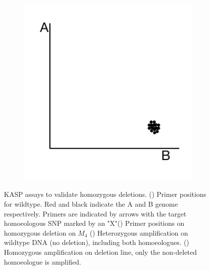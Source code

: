 \begin{figure}
\begin{subfigure}[b]{0.3\textwidth}
        \label{fig:poly:homFalse}
    \end{subfigure}
    ~
    \begin{subfigure}[b]{0.3\textwidth}
        \caption{}
        \includegraphics[width=1\textwidth]{PolyMarker/Figures/deletions/homReal.pdf}
        \label{fig:poly:homReal}
    \end{subfigure}
    \caption{KASP assays to validate homozygous deletions. () Primer positions for wildtype. Red and black indicate the A and B genome respectively. Primers are indicated by arrows with the target homoeologous SNP marked by an "X"() Primer positions on  homozygous deletion on $M_{4}$ () Heterozygous amplification on wildtype DNA (no deletion), including both homoeologues. () Homozygous amplification on deletion line, only the non-deleted homoeologue is amplified. }
\end{figure}



